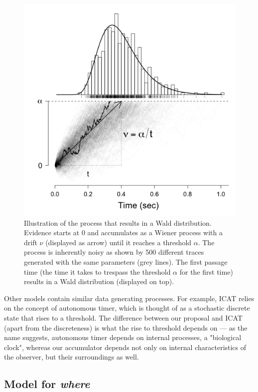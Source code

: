 \documentclass{article}
\begin{document}
\begin{figure}
    \centering
    \includegraphics[width=\linewidth]{figures/wald_distribution.png}
    \caption{Illustration of the process that results in a Wald distribution. Evidence starts at 0 and accumulates as a Wiener process with a drift $\nu$ (displayed as arrow) until it reaches a threshold $\alpha$. The process is inherently noisy as shown by 500 different traces generated with the same parameters (grey lines). The first passage time (the time it takes to trespass the threshold $\alpha$ for the first time) results in a Wald distribution (displayed on top).}
    \label{fig:wald_distribution}
\end{figure}

Other models contain similar data generating processes. For example, ICAT \citep{trukenbrod2014icat} relies on the concept of autonomous timer, which is thought of as a stochastic discrete state that rises to a threshold. The difference between our proposal and ICAT (apart from the discreteness) is what the rise to threshold depends on --- as the name suggests, autonomous timer depends on internal processes, a "biological clock", whereas our accumulator depends not only on internal characteristics of the observer, but their surroundings as well.

\subsection{Model for \textit{where}}
\end{document}
